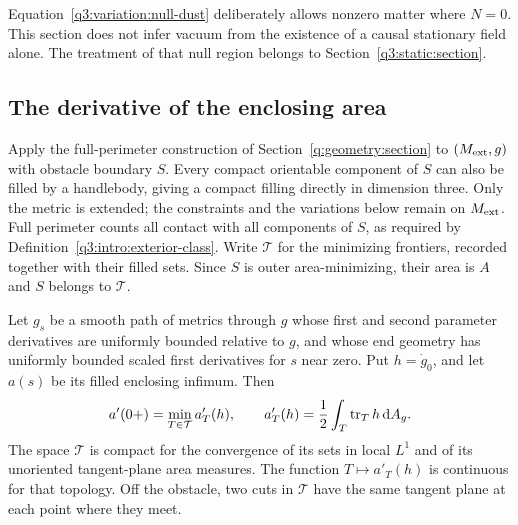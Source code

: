 Equation~\eqref{q3:variation:null-dust} deliberately allows nonzero
matter where $N=0$.  This section does not infer vacuum from the
existence of a causal stationary field alone.  The treatment of that
null region belongs to Section~\ref{q3:static:section}.

\subsection{The derivative of the enclosing area}
\label{q3:variation:area-subsection}

Apply the full-perimeter construction of
Section~\ref{q:geometry:section} to $(M_{\mathrm{ext}},g)$ with obstacle boundary
$S$. Every compact orientable component of $S$ can also be filled by
a handlebody, giving a compact filling directly in dimension three.
Only the metric is extended; the constraints and the variations below
remain on $M_{\mathrm{ext}}$. Full perimeter counts all contact with all components
of $S$, as required by Definition~\ref{q3:intro:exterior-class}.
Write $\mathcal T$ for the minimizing frontiers, recorded together
with their filled sets. Since $S$ is outer area-minimizing, their
area is $A$ and $S$ belongs to $\mathcal T$.

\begin{lemma}
\label{q3:variation:area-envelope}
Let $g_s$ be a smooth path of metrics through $g$ whose first and
second parameter derivatives are uniformly bounded relative to $g$,
and whose end geometry has uniformly bounded scaled first derivatives
for $s$ near zero. Put $h=\dot g_0$, and let $a(s)$ be its filled
enclosing infimum. Then
\begin{equation}
 a'(0+)=\min_{T\in\mathcal T}a'_T(h),\qquad
 a'_T(h)=\frac12\int_T\operatorname{tr}_T h\,\mathrm d A_g.
 \label{q3:variation:area-envelope-formula}
\end{equation}
The space $\mathcal T$ is compact for the convergence of its sets in
local $L^1$ and of its unoriented tangent-plane area measures. The
function $T\mapsto a'_T(h)$ is continuous for that topology.
Off the obstacle, two cuts in $\mathcal T$ have the same tangent
plane at each point where they meet.
\end{lemma}

